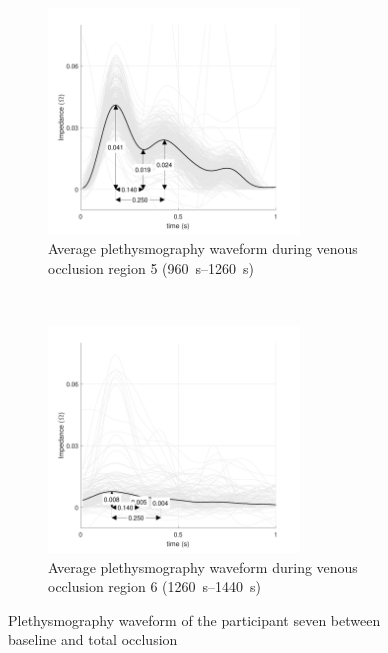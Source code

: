 \begin{figure}[!htbp]
	\centering
	\begin{subfigure}[t]{0.48\textwidth}
		\centering
		\includegraphics[height=6cm]{figure10a}
		\caption{Average plethysmography waveform during venous occlusion region 5 (\SIrange{960}{1260}{\second})}
		\label{fig:iPG_total_baseline}
	\end{subfigure}%
	~ 
	\begin{subfigure}[t]{0.48\textwidth}
		\centering
		\includegraphics[height=6cm]{figure10b}
		\caption{Average plethysmography waveform during venous occlusion region 6 (\SIrange{1260}{1440}{\second})}
		\label{fig:iPG_total_occlusion}
	\end{subfigure}
	\caption{Plethysmography waveform of the participant seven between baseline and total occlusion}
	\label{fig:iPG_total}
\end{figure}

